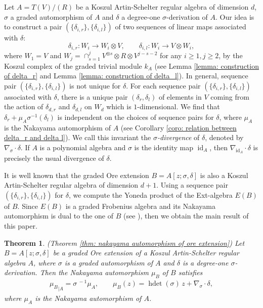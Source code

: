 \documentclass[a4paper,10pt]{amsart}
\newtheorem{theorem}{Theorem}[section]
\theoremstyle{definition}
\numberwithin{equation}{section}
\DeclareMathOperator{\id}{id}
\DeclareMathOperator{\hdet}{hdet}
\begin{document}
Let $A=T(V)/(R)$ be a Koszul Artin-Schelter regular algebra of dimension $d$, ${\sigma}$ a graded automorphism of $A$ and ${\delta}$ a degree-one ${\sigma}$-derivation of $A$. Our idea is to construct a pair $(\{\delta_{i,r}\},\{\delta_{i,l}\})$ of two sequences of linear maps associated with ${\delta}$:
$$
\delta_{i,r}:W_i\to W_i\otimes V,\qquad \delta_{i,l}: W_i\to V\otimes W_i,
$$
where $W_1=V$ and $W_j=\cap_{s=1}^{j} V^{\otimes s}\otimes R\otimes V^{j-s-2}$ for any $i\geq 1,j\geq 2$, by the Koszul complex of the graded trivial module $k_A$ (see Lemma \ref{lemma: construction of delta_r} and Lemma \ref{lemma: construction of delta_l}). In general,  sequence pair $(\{\delta_{i,r}\},\{\delta_{i,l}\})$  is not unique for ${\delta}$. For each sequence pair $(\{\delta_{i,r}\},\{\delta_{i,l}\})$ associated with ${\delta}$, there is a unique pair $(\delta_r,\delta_l)$ of elements in $V$ coming from the action of $\delta_{d,r}$ and $\delta_{d,l}$ on $W_d$ which is $1$-dimensional. We find that $\delta_{r}+\mu_A{\sigma}^{-1}(\delta_l)$ is independent on the choices of sequence pairs for $\delta$, where $\mu_A$ is the Nakayama automorphism of $A$ (see Corollary \ref{coro: relation between delta_r and delta l}). We call this invariant the \emph{${\sigma}$-divergence} of ${\delta}$, denoted by $\nabla_{{\sigma}}\cdot{\delta}$. If $A$ is a polynomial algebra and $\sigma$ is the identity map $\id_A$, then $\nabla_{{\id_A}}\cdot{\delta}$ is precisely the usual divergence of $\delta$.

It is well known that the graded Ore extension $B=A[z;{\sigma},{\delta}]$ is also a Koszul Artin-Schelter regular algebra of dimension $d+1$. Using a sequence pair $(\{\delta_{i,r}\},\{\delta_{i,l}\})$ for ${\delta}$, we compute the Yoneda product of the Ext-algebra $E(B)$ of $B$. Since $E(B)$ is a graded Frobenius algebra and its Nakayama automorphism is dual to the one of $B$ (see \cite{RRZ2,V}), then we obtain the main result of this paper.

\begin{theorem}\emph{(Theorem \ref{thm: nakayama automorphism of ore extension})}
Let $B=A[z;{\sigma},{\delta}]$ be a graded Ore extension of a Koszul Artin-Schelter regular algebra $A$, where ${\sigma}$ is a graded automorphism of $A$ and $\delta$ is a degree-one $\sigma$-derivation. Then the Nakayama automorphism $\mu_B$ of $B$ satisfies
\begin{align*}
{\mu_{B}}_{\mid A}={\sigma}^{~-1}\mu_A,\qquad
\mu_B(z)=\hdet({\sigma})\, z+\nabla_{{\sigma}}\cdot{\delta},
\end{align*}
where $\mu_A$ is the Nakayama automorphism of $A$.
\end{theorem}
\end{document}
